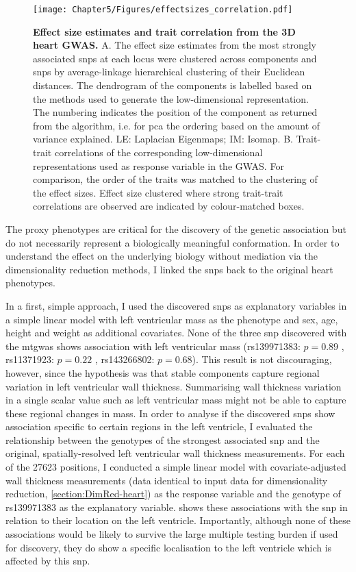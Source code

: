 \begin{figure}[hbtp]
	\centering
	\texttt{[image: Chapter5/Figures/effectsizes\_correlation.pdf]}
	\caption[\textbf{Effect size estimates and trait correlation from the 3D heart GWAS. }]{\textbf{Effect size estimates and trait correlation from the 3D heart GWAS. } A. The effect size estimates from the most strongly associated \glspl{snp} at each locus were clustered across components and \glspl{snp} by average-linkage hierarchical clustering of their Euclidean distances. The dendrogram of the components is labelled based on the methods used to generate the low-dimensional representation. The numbering indicates the position of the component as returned from the algorithm, i.e. for \gls{pca}  the ordering based on the amount of variance explained. LE: Laplacian Eigenmaps; IM: Isomap. B. Trait-trait correlations of the corresponding low-dimensional representations used as response variable in the GWAS. For comparison, the order of the traits was matched to the clustering of the effect sizes. Effect size clustered where strong trait-trait correlations are observed are indicated by colour-matched boxes.} 
	 	\label{fig:effectsizes-heart}
\end{figure}
%
The proxy phenotypes are critical for the discovery of the genetic association but do not necessarily represent a biologically meaningful conformation. In order to understand the effect on the underlying biology without mediation via the dimensionality reduction methods, I linked the \glspl{snp} back to the original heart phenotypes.

In a first, simple approach, I used the discovered \glspl{snp} as explanatory variables in a simple linear model with left ventricular mass as the phenotype and sex, age, height and weight as additional covariates. None of the three \gls{snp} discovered with the \gls{mtgwas} shows association with left ventricular mass (rs139971383: \(p=0.89\) , rs11371923: \(p=0.22\) , rs143266802: \(p=0.68\)). This result is not discouraging, however, since the hypothesis was that stable components capture regional variation in left ventricular wall thickness. Summarising wall thickness variation in a single scalar value such as left ventricular mass might not be able to capture these regional changes in mass. In order to analyse if the discovered \glspl{snp} show association specific to certain regions in the left ventricle, I evaluated the relationship between the genotypes of the strongest associated \gls{snp} and the original, spatially-resolved left ventricular wall thickness measurements. 
For each of the \num{27623} positions, I conducted a simple linear model with covariate-adjusted wall thickness measurements (data identical to input data for dimensionality reduction, \cref{section:DimRed-heart}) as the response variable and the genotype of rs139971383 as the explanatory variable.  shows these associations with the \gls{snp} in relation to their location on the left ventricle. Importantly, although none of these associations would be likely to survive the large multiple testing burden if used for discovery, they do show a specific localisation to the left ventricle which is affected by this \gls{snp}.

